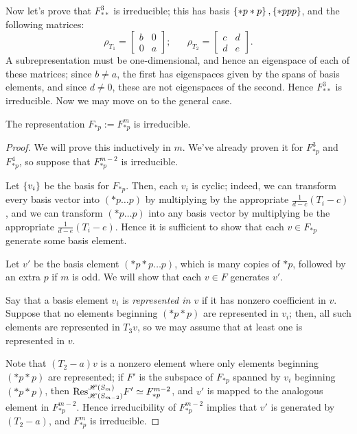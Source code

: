 \documentclass{amsart}
\begin{document}
Now let's prove that $F^3_{**}$ is irreducible;
this has basis $\left\{ *p*p \right\}, \left\{ *ppp \right\}$, and the following matrices:
\[
  \rho_{T_1} = \begin{bmatrix}
    b & 0\\
    0 & a
  \end{bmatrix}; \hspace{20pt}
  \rho_{T_2} = \begin{bmatrix}
    c & d\\
    d & e
  \end{bmatrix}.
\]
A subrepresentation must be one-dimensional, and hence an eigenspace of each of these matrices;
since $b \neq a$, the first has eigenspaces given by the spans of basis elements, and since $d \neq 0$, these are not eigenspaces of the second.
Hence $F^3_{**}$ is irreducible.
Now we may move on to the general case.
\begin{proposition}
  The representation $F_{*p} := F^m_{*p}$ is irreducible.
\end{proposition}
\begin{proof}
  We will prove this inductively in $m$.
  We've already proven it for $F^3_{*p}$ and $F^4_{*p}$, so suppose that $F^{m-2}_{*p}$ is irreducible.
  
  Let $\left\{ v_i \right\}$ be the basis for $F_{*p}$.
  Then, each $v_i$ is cyclic; indeed, we can transform every basis vector into $(*p\dots p)$ by multiplying by the appropriate $\frac{1}{d-c}(T_i - c)$, and we can transform $(*p\dots p)$ into any basis vector by multiplying be the appropriate $\frac{1}{d-e}(T_i - e)$.
  Hence it is sufficient to show that each $v \in F_{*p}$ generate some basis element.

  Let $v'$ be the basis element $(*p*p\dots p)$, which is many copies of $*p$, followed by an extra $p$ if $m$ is odd.
  We will show that each $v \in F$ generates $v'$.

  Say that a basis element $v_i$ is \emph{represented in $v$} if it has nonzero coefficient in $v$.
  Suppose that no elements beginning $(*p*p)$ are represented in $v_i$;
  then, all such elements are represented in $T_3v$, so we may assume that at least one is represented in $v$.

  Note that $(T_2 - a)v$ is a nonzero element where only elements beginning $(*p*p)$ are represented;
  if $F'$ is the subspace of $F_{*p}$ spanned by $v_i$ beginning $(*p*p)$, then $\text{Res}_{\mathscr{H}(S_{m-2})}^{\mathscr{H}(S_m)} F' \simeq F^{m-2}_{*p}$, and $v'$ is mapped to the analogous element in $F^{m-2}_{*p}$.
  Hence irreducibility of $F^{m-2}_{*p}$ implies that $v'$ is generated by $(T_2 - a)$, and $F^m_{*p}$ is irreducible.
\end{proof}
\end{document}
